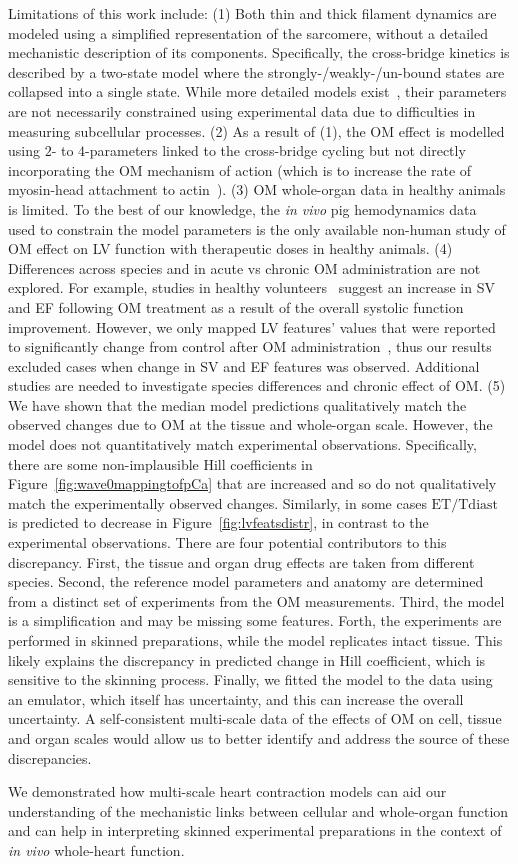 \vspace{0.2cm}
Limitations of this work include: (1) Both thin and thick filament dynamics are modeled using a simplified representation of the sarcomere, without a detailed mechanistic description of its components. Specifically, the cross-bridge kinetics is described by a two-state model where the strongly-/weakly-/un-bound states are collapsed into a single state. While more detailed models exist~\cite{Land:2015}, their parameters are not necessarily constrained using experimental data due to difficulties in measuring subcellular processes. (2) As a result of (1), the OM effect is modelled using $2$- to $4$-parameters linked to the cross-bridge cycling but not directly incorporating the OM mechanism of action (which is to increase the rate of myosin-head attachment to actin~\cite{Malik:2011}). (3) OM whole-organ data in healthy animals is limited. To the best of our knowledge, the \textit{in vivo} pig hemodynamics data~\cite{Bakkehaug:2015} used to constrain the model parameters is the only available non-human study of OM effect on LV function with therapeutic doses in healthy animals. (4) Differences across species and in acute vs chronic OM administration are not explored. For example, studies in healthy volunteers~\cite{Teerlink:2011} suggest an increase in SV and EF following OM treatment as a result of the overall systolic function improvement. However, we only mapped LV features' values that were reported to significantly change from control after OM administration~\cite{Bakkehaug:2015}, thus our results excluded cases when change in SV and EF features was observed. Additional studies are needed to investigate species differences and chronic effect of OM. (5) We have shown that the median model predictions qualitatively match the observed changes due to OM at the tissue and whole-organ scale. However, the model does not quantitatively match experimental observations. Specifically, there are some non-implausible Hill coefficients in Figure~\ref{fig:wave0mappingtofpCa} that are increased and so do not qualitatively match the experimentally observed changes. Similarly, in some cases $\textrm{ET}/\textrm{Tdiast}$ is predicted to decrease in Figure~\ref{fig:lvfeatsdistr}, in contrast to the experimental observations. There are four potential contributors to this discrepancy. First, the tissue and organ drug effects are taken from different species. Second, the reference model parameters and anatomy are determined from a distinct set of experiments from the OM measurements. Third, the model is a simplification and may be missing some features. Forth, the experiments are performed in skinned preparations, while the model replicates intact tissue. This likely explains the discrepancy in predicted change in Hill coefficient, which is sensitive to the skinning process. Finally, we fitted the model to the data using an emulator, which itself has uncertainty, and this can increase the overall uncertainty. A self-consistent multi-scale data of the effects of OM on cell, tissue and organ scales would allow us to better identify and address the source of these discrepancies.

\vspace{0.2cm}
We demonstrated how multi-scale heart contraction models can aid our understanding of the mechanistic links between cellular and whole-organ function and can help in interpreting skinned experimental preparations in the context of \textit{in vivo} whole-heart function.